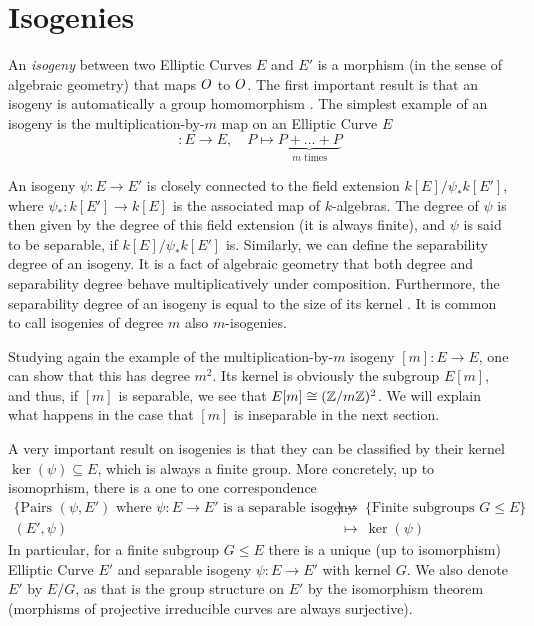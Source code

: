 \section{Isogenies}
An \emph{isogeny} between two Elliptic Curves $E$ and $E'$ is a morphism (in the sense of algebraic geometry) that maps $O$ to $O$.
The first important result is that an isogeny is automatically a group homomorphism \cite[Thm~III.4.8]{arithmetic_elliptic_curves}.
The simplest example of an isogeny is the multiplication-by-$m$ map on an Elliptic Curve $E$
\begin{equation*}
    [m]: E \to E, \quad P \mapsto \underbrace{P + ... + P}_{\text{$m$ times}}
\end{equation*}

An isogeny $\psi: E \to E'$ is closely connected to the field extension $k[E]/\psi_*k[E']$, where $\psi_*: k[E'] \to k[E]$ is the associated map of $k$-algebras.
The degree of $\psi$ is then given by the degree of this field extension (it is always finite), and $\psi$ is said to be separable, if $k[E]/\psi_*k[E']$ is.
Similarly, we can define the separability degree of an isogeny.
It is a fact of algebraic geometry that both degree and separability degree behave multiplicatively under composition.
Furthermore, the separability degree of an isogeny is equal to the size of its kernel \cite[Thm~III.4.10]{arithmetic_elliptic_curves}.
It is common to call isogenies of degree $m$ also $m$-isogenies.

Studying again the example of the multiplication-by-$m$ isogeny $[m]: E \to E$, one can show that this has degree $m^2$.
Its kernel is obviously the subgroup $E[m]$, and thus, if $[m]$ is separable, we see that $E[m] \cong (\mathbb{Z}/m\mathbb{Z})^2$.
We will explain what happens in the case that $[m]$ is inseparable in the next section.

A very important result on isogenies is that they can be classified by their kernel $\ker(\psi) \subseteq E$, which is always a finite group.
More concretely, up to isomoprhism, there is a one to one correspondence
\begin{align*}
    \{ \text{Pairs $(\psi, E')$ where $\psi: E \to E'$ is a separable isogeny} \}  \ &\to \ \{ \text{Finite subgroups $G \leq E$} \} \\
    (E', \psi) \ &\mapsto \ \ker(\psi)
\end{align*}
In particular, for a finite subgroup $G \leq E$ there is a unique (up to isomorphism) Elliptic Curve $E'$ and separable isogeny $\psi: E \to E'$ with kernel $G$.
We also denote $E'$ by $E/G$, as that is the group structure on $E'$ by the isomorphism theorem (morphisms of projective irreducible curves are always surjective).

